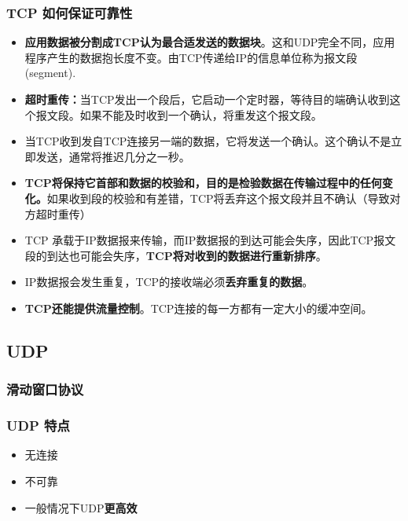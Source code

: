 \documentclass[UTF8,a4paper,12pt]{ctexbook}
\begin{document}
			\subsubsection{TCP 如何保证可靠性}
				\begin{itemize}
					\item \textbf{应用数据被分割成TCP认为最合适发送的数据块}。这和UDP完全不同，应用程序产生的数据抱长度不变。由TCP传递给IP的信息单位称为报文段(segment).
					
					\item \textbf{超时重传：}当TCP发出一个段后，它启动一个定时器，等待目的端确认收到这个报文段。如果不能及时收到一个确认，将重发这个报文段。
					
					\item 当TCP收到发自TCP连接另一端的数据，它将发送一个确认。这个确认不是立即发送，通常将推迟几分之一秒。
					
					\item \textbf{TCP将保持它首部和数据的校验和，目的是检验数据在传输过程中的任何变化。}如果收到段的校验和有差错，TCP将丢弃这个报文段并且不确认（导致对方超时重传） 
					
					\item TCP 承载于IP数据报来传输，而IP数据报的到达可能会失序，因此TCP报文段的到达也可能会失序，\textbf{TCP将对收到的数据进行重新排序}。
					
					\item IP数据报会发生重复，TCP的接收端必须\textbf{丢弃重复的数据}。
					
					\item \textbf{TCP还能提供流量控制}。TCP连接的每一方都有一定大小的缓冲空间。
				\end{itemize}
		
		\subsection{UDP}
			\subsubsection{滑动窗口协议}
			
			\subsubsection{UDP 特点}
				\begin{itemize}
					\item 无连接
					\item 不可靠
					\item 一般情况下UDP\textbf{更高效}
				\end{itemize}
\end{document}
